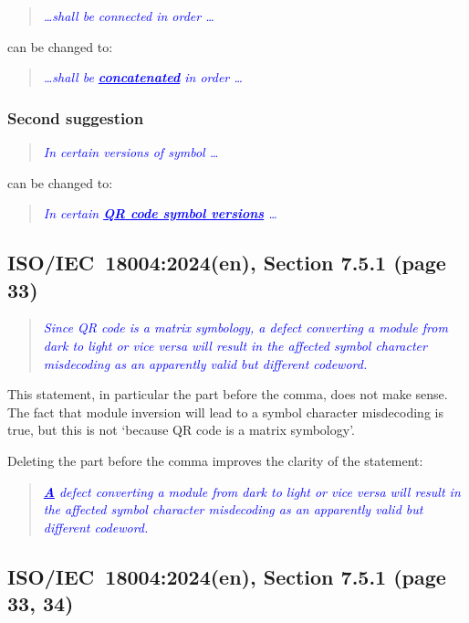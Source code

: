 \documentclass[a4paper,twoside]{article}
\newcommand{\shortstandard}{ISO/IEC~18004}
\newcommand{\standard}{\shortstandard:2024(en)}
\newcommand{\quotestandard}[1]{\textcolor{blue}{\textit{#1}}}
\newcommand{\ddd}{\dots}
\newcommand{\change}[1]{\underline{\textbf{#1}}}
\begin{document}
\begin{quote}
\quotestandard{\ddd shall be connected in order \ddd}
\end{quote}

can be changed to:

\begin{quote}
\quotestandard{\ddd shall be \change{concatenated} in order \ddd}
\end{quote}

\subsubsection*{Second suggestion}

\begin{quote}
\quotestandard{In certain versions of symbol \ddd}
\end{quote}

can be changed to:

\begin{quote}
\quotestandard{In certain \change{QR code symbol versions} \ddd}
\end{quote}

\subsection{\standard, Section 7.5.1 (page 33)}

\begin{quote}
\quotestandard{Since QR code is a matrix symbology, a defect converting a module from dark to light or vice versa
will result in the affected symbol character misdecoding as an apparently valid but different codeword.}
\end{quote}

This statement, in particular the part before the comma, does not make sense. The fact that module
inversion will lead to a symbol character misdecoding is true, but this is not `because QR code is a
matrix symbology'.

Deleting the part before the comma improves the clarity of the statement:

\begin{quote}
\quotestandard{\change{A} defect converting a module from dark to light or vice versa will result in the affected symbol
character misdecoding as an apparently valid but different codeword.}
\end{quote}

\subsection{\standard, Section 7.5.1 (page 33, 34)}
\end{document}
